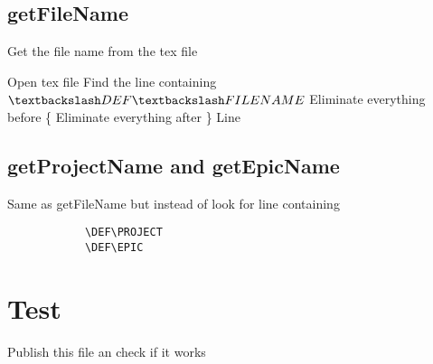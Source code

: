     \subsection{getFileName}
        \begin{algorithm}[h!]
            \caption{Get the file name from the tex file}
        \begin{algorithmic}
            \State Open tex file
            \State Find the line containing $\textbackslash DEF \textbackslash FILENAME$
            \State Eliminate everything before \{
            \State Eliminate everything after \}
            \State \Return Line
            \EndFunction
        \end{algorithmic}
        \end{algorithm}

    \subsection{getProjectName and getEpicName}
        Same as getFileName but instead of look for line containing
        \begin{verbatim}
            \DEF\PROJECT
            \DEF\EPIC
        \end{verbatim}

    \section{Test}
    Publish this file an check if it works
